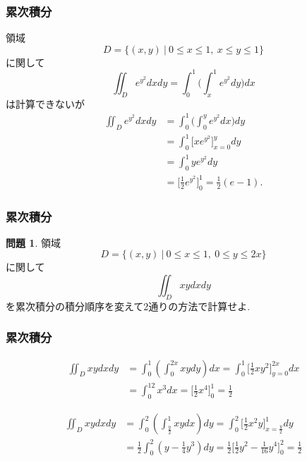 \documentclass[dvipdfmx,cjk,10.2pt]{beamer}
\theoremstyle{definition}
\newtheorem{Prob}[Thm]{問題}
\begin{document}



\begin{frame}
\frametitle{累次積分}

領域
$$
D=\{(x,y) \ | \ 0 \le x \le 1, \ x\le y \le 1\}
$$
に関して
$$
\iint_D e^{y^2} dxdy = \int_0^1 \big(\int_x^1 e^{y^2}dy\big)dx
$$
は計算できないが
\begin{align*}
\iint_D e^{y^2} dxdy &= \int_0^1 \big(\int_0^y e^{y^2}dx\big)dy \\
& = \int_0^1\big[xe^{y^2}\big]_{x=0}^ydy \\
& = \int_0^1ye^{y^2}dy \\
& = \big[\frac{1}{2}e^{y^2}\big]_0^1=\frac{1}{2}(e-1). 
\end{align*}


\end{frame}





\begin{frame}
\frametitle{累次積分}

\begin{Prob}
領域
$$
D=\{(x,y) \ | \ 0 \le x \le 1, \ 0\le y \le 2x\}
$$
に関して
$$
\iint_D xy dxdy 
$$
を累次積分の積分順序を変えて2通りの方法で計算せよ. 
\end{Prob}

\end{frame}





\begin{frame}
\frametitle{累次積分}

\begin{align*}
\iint_D xy dxdy & = \int_0^1 (\int_0^{2x} xydy)dx = \int_0^1 \big[\frac{1}{2}xy^2\big]_{y=0}^{2x}dx \\
& = \int_0^12x^3 dx= \big[\frac{1}{2}x^4\big]_0^1=\frac{1}{2}
\end{align*}

\begin{align*}
\iint_D xy dxdy & = \int_0^2 (\int_{\frac{y}{2}}^{1} xydx)dy 
 = \int_0^2 \big[\frac{1}{2}x^2y \big]_{x=\frac{y}{2}}^{1}dy \\
 & = \frac{1}{2}\int_0^2 (y-\frac{1}{4}y^3)dy = \frac{1}{2}\big[\frac{1}{2}y^2- \frac{1}{16}y^4\big]_0^2=\frac{1}{2}
\end{align*}

\end{frame}
\end{document}
